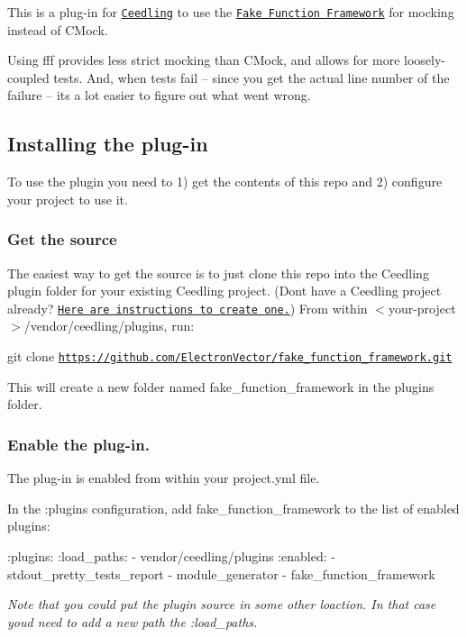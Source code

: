 This is a plug-\/in for \href{https://github.com/ThrowTheSwitch/Ceedling}{\tt Ceedling} to use the \href{https://github.com/meekrosoft/fff}{\tt Fake Function Framework} for mocking instead of C\+Mock.

Using fff provides less strict mocking than C\+Mock, and allows for more loosely-\/coupled tests. And, when tests fail -- since you get the actual line number of the failure -- it\textquotesingle{}s a lot easier to figure out what went wrong.

\subsection*{Installing the plug-\/in}

To use the plugin you need to 1) get the contents of this repo and 2) configure your project to use it.

\subsubsection*{Get the source}

The easiest way to get the source is to just clone this repo into the Ceedling plugin folder for your existing Ceedling project. (Don\textquotesingle{}t have a Ceedling project already? \href{http://www.electronvector.com/blog/try-embedded-test-driven-development-right-now-with-ceedling}{\tt Here are instructions to create one.}) From within {\ttfamily $<$your-\/project$>$/vendor/ceedling/plugins}, run\+:

{\ttfamily git clone \href{https://github.com/ElectronVector/fake_function_framework.git}{\tt https\+://github.\+com/\+Electron\+Vector/fake\+\_\+function\+\_\+framework.\+git}}

This will create a new folder named {\ttfamily fake\+\_\+function\+\_\+framework} in the plugins folder.

\subsubsection*{Enable the plug-\/in.}

The plug-\/in is enabled from within your project.\+yml file.

In the {\ttfamily \+:plugins} configuration, add {\ttfamily fake\+\_\+function\+\_\+framework} to the list of enabled plugins\+:


\begin{DoxyCode}
:plugins:
  :load\_paths:
    - vendor/ceedling/plugins
  :enabled:
    - stdout\_pretty\_tests\_report
    - module\_generator
    - fake\_function\_framework
\end{DoxyCode}
 {\itshape Note that you could put the plugin source in some other loaction. In that case you\textquotesingle{}d need to add a new path the {\ttfamily \+:load\+\_\+paths}.}

